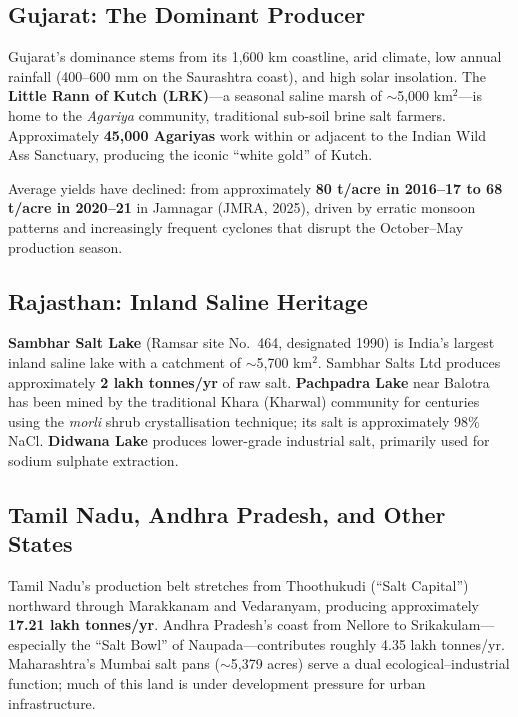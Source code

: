 \documentclass[12pt,a4paper]{article}
\begin{document}
\subsection{Gujarat: The Dominant Producer}

Gujarat's dominance stems from its 1,600 km coastline, arid climate, low annual
rainfall (400--600 mm on the Saurashtra coast), and high solar insolation. The
\textbf{Little Rann of Kutch (LRK)}—a seasonal saline marsh of $\sim$5,000 km$^2$—is
home to the \textit{Agariya} community, traditional sub-soil brine salt farmers.
Approximately \textbf{45,000 Agariyas} work within or adjacent to the Indian Wild Ass
Sanctuary, producing the iconic ``white gold'' of Kutch.

Average yields have declined: from approximately \textbf{80 t/acre in 2016--17 to
68 t/acre in 2020--21} in Jamnagar (JMRA, 2025), driven by erratic monsoon patterns
and increasingly frequent cyclones that disrupt the October--May production season.

\subsection{Rajasthan: Inland Saline Heritage}

\textbf{Sambhar Salt Lake} (Ramsar site No.\ 464, designated 1990) is India's largest
inland saline lake with a catchment of $\sim$5,700 km$^2$. Sambhar Salts Ltd produces
approximately \textbf{2 lakh tonnes/yr} of raw salt. \textbf{Pachpadra Lake} near
Balotra has been mined by the traditional Khara (Kharwal) community for centuries using
the \textit{morli} shrub crystallisation technique; its salt is approximately 98\% NaCl.
\textbf{Didwana Lake} produces lower-grade industrial salt, primarily used for sodium
sulphate extraction.

\subsection{Tamil Nadu, Andhra Pradesh, and Other States}

Tamil Nadu's production belt stretches from Thoothukudi (``Salt Capital'') northward
through Marakkanam and Vedaranyam, producing approximately \textbf{17.21 lakh tonnes/yr}.
Andhra Pradesh's coast from Nellore to Srikakulam—especially the ``Salt Bowl'' of
Naupada—contributes roughly 4.35 lakh tonnes/yr. Maharashtra's Mumbai salt pans
($\sim$5,379 acres) serve a dual ecological--industrial function; much of this land is
under development pressure for urban infrastructure.
\end{document}
